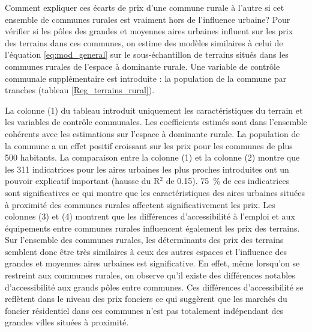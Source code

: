 \documentclass[10.5pt,a4paper]{article}
\begin{document}
{Comment expliquer ces écarts de prix d'une commune rurale à l'autre si cet ensemble de communes rurales est vraiment hors de l'influence urbaine? Pour vérifier si les pôles des grandes et moyennes aires urbaines influent sur les prix des terrains dans ces communes, on estime des modèles similaires à celui de l'équation \ref{eq:mod_general} sur le sous-échantillon de terrains situés dans les communes rurales de l'espace à dominante rurale. Une variable de contrôle communale supplémentaire est introduite : la population de la commune par tranches (tableau \ref{Reg_terrains_rural}). \par



La colonne (1) du tableau introduit uniquement les caractéristiques du terrain et les variables de contrôle communales. Les coefficients estimés sont dans l'ensemble cohérents avec les estimations sur l'espace à dominante rurale. La population de la commune a un effet positif croissant sur les prix pour les communes de plus 500 habitants. La comparaison entre la colonne (1) et la colonne (2) montre que les 311 indicatrices pour les aires urbaines les plus proches introduites ont un pouvoir explicatif important (hausse du R$^2$ de 0.15). 75~\% de ces indicatrices sont significatives ce qui montre que les caractéristiques des aires urbaines situées à proximité des communes rurales affectent significativement les prix. Les colonnes (3) et  (4) montrent que les différences d'accessibilité à l'emploi et aux équipements entre communes rurales influencent également les prix des terrains. Sur l'ensemble des communes rurales, les déterminants des prix des terrains semblent donc être très similaires à ceux des autres espaces et l'influence des grandes et moyennes aires urbaines est significative. En effet, même lorsqu'on se restreint aux communes rurales, on observe qu'il existe des différences notables d'accessibilité aux grands pôles entre communes. Ces différences d'accessibilité se reflètent dans le niveau des prix fonciers ce qui suggèrent que les marchés du foncier résidentiel dans ces communes n'est pas totalement indépendant des grandes villes situées à proximité. \par

}
\end{document}
